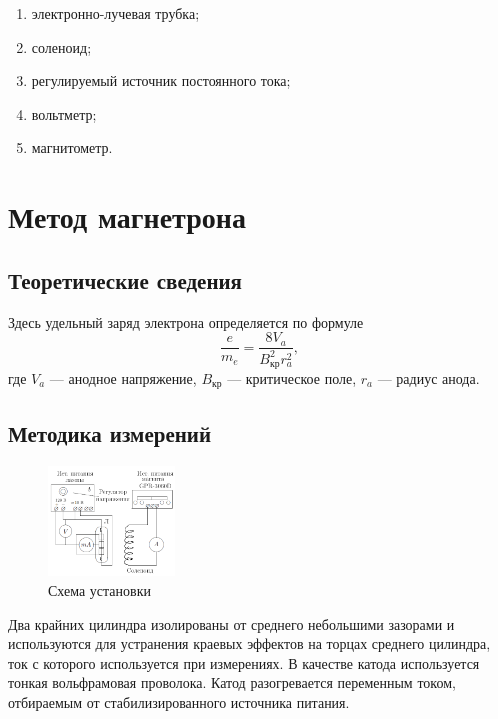 \documentclass[a4paper, 12pt]{article}
\begin{document}
\begin{enumerate}
    \item электронно-лучевая трубка;
    \item соленоид;
    \item регулируемый источник постоянного тока;
    \item вольтметр;
    \item магнитометр.
\end{enumerate}

\section{Метод магнетрона}

\subsection{Теоретические сведения}

Здесь удельный заряд электрона определяется по формуле
\begin{equation}
\dfrac{e}{m_e} = \dfrac{8V_a}{B_{\text{кр}}^2r_a^2},
\end{equation}
где $V_a$ --- анодное напряжение, $B_{\text{кр}}$ --- критическое поле, $r_a$ --- радиус анода.

\subsection{Методика измерений}

\begin{figure}
  \begin{center}
    \includegraphics[width = 0.3\textwidth]{2.png}
  \end{center}
  \caption{Схема установки}
\end{figure}
Два крайних цилиндра изолированы от среднего небольшими зазорами и используются для устранения краевых эффектов на торцах среднего цилиндра, ток с которого используется при измерениях. В качестве катода используется тонкая вольфрамовая проволока. Катод разогревается переменным током, отбираемым от стабилизированного источника питания. 
\end{document}
